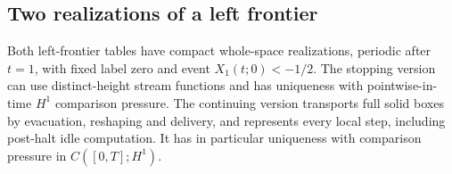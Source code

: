 \subsection{Two realizations of a left frontier}

\begin{proposition}
\label{prop:bb-mid-stream}\label{prop:bb-mid-parking}
Both left-frontier tables have compact whole-space realizations,
periodic after $t=1$, with fixed label zero and event $X_1(t;0)<-1/2$.
The stopping version can use distinct-height stream functions and
has uniqueness with pointwise-in-time $H^1$ comparison pressure.
The continuing version transports full solid boxes by evacuation,
reshaping and delivery, and represents every local step, including
post-halt idle computation.  It has in particular uniqueness with
comparison pressure in $C([0,T];H^1)$.
\end{proposition}
